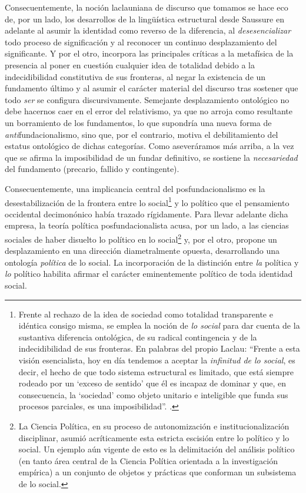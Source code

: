 Consecuentemente, la noción laclauniana de discurso que tomamos se hace eco de, por un lado, los desarrollos de la lingüística estructural desde Saussure en adelante al asumir la identidad como reverso de la diferencia, al \emph{desesencializar} todo proceso de significación y al reconocer un continuo desplazamiento del significante. Y por el otro, incorpora las principales críticas a la metafísica de la presencia al poner en cuestión cualquier idea de totalidad debido a la indecidibilidad constitutiva de sus fronteras, al negar la existencia de un fundamento último y al asumir el carácter material del discurso tras sostener que todo \emph{ser} se configura discursivamente. Semejante desplazamiento ontológico no debe hacernos caer en el error del relativismo, ya que no arroja como resultante un borramiento de los fundamentos, lo que supondría una nueva forma de \emph{anti}fundacionalismo, sino que, por el contrario, motiva el debilitamiento del estatus ontológico de dichas categorías. Como aseveráramos más arriba, a la vez que se afirma la imposibilidad de un fundar definitivo, se sostiene la \emph{necesariedad} del fundamento (precario, fallido y contingente).

Consecuentemente, una implicancia central del posfundacionalismo es la desestabilización de la frontera entre lo social\footnote{Frente al rechazo de la idea de sociedad como totalidad transparente e idéntica consigo misma, se emplea la noción de \emph{lo social} para dar cuenta de la sustantiva diferencia ontológica, de su radical contingencia y de la indecidibilidad de sus fronteras. En palabras del propio Laclau: \enquote{Frente a esta visión esencialista, hoy en día tendemos a aceptar la \emph{infinitud de lo social}, es decir, el hecho de que todo sistema estructural es limitado, que está siempre rodeado por un \enquote{exceso de sentido} que él es incapaz de dominar y que, en consecuencia, la \enquote{sociedad} como objeto unitario e inteligible que funda sus procesos parciales, es una imposibilidad}. \cite[][104]{@6999-LACLAU1990}.} y lo político que el pensamiento occidental decimonónico había trazado rígidamente. Para llevar adelante dicha empresa, la teoría política posfundacionalista acusa, por un lado, a las ciencias sociales de haber disuelto lo político en lo social\footnote{La Ciencia Política, en su proceso de autonomización e institucionalización disciplinar, asumió acríticamente esta estricta escisión entre lo político y lo social. Un ejemplo aún vigente de esto es la delimitación del análisis político (en tanto área central de la Ciencia Política orientada a la investigación empírica) a un conjunto de objetos y prácticas que conforman un subsistema de lo social.} y, por el otro, propone un desplazamiento en una dirección diametralmente opuesta, desarrollando una ontología \emph{política} de lo social. La incorporación de la distinción entre \emph{la} política y \emph{lo} político  habilita afirmar el carácter eminentemente político de toda identidad social.

